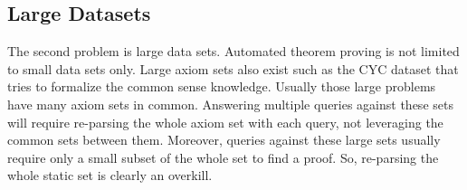 \subsection{Large Datasets}
The second problem is large data sets. Automated theorem proving is not limited to small data sets only. Large axiom sets also exist such as the CYC dataset that tries to formalize the common sense knowledge. Usually those large problems have many axiom sets in common. Answering multiple queries against these sets will require re-parsing the whole axiom set with each query, not leveraging the common sets between them. Moreover, queries against these large sets usually require only a small subset of the whole set to find a proof. So, re-parsing the whole static set is clearly an overkill.
